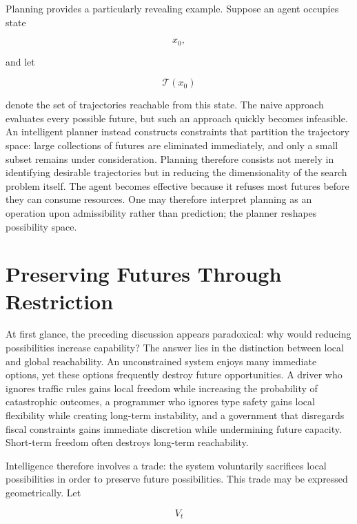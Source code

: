 \documentclass[11pt,oneside]{book}
\theoremstyle{plain}
\theoremstyle{definition}
\theoremstyle{remark}
\begin{document}
Planning provides a particularly revealing example. Suppose an agent occupies state

\begin{equation}
x_0,
\end{equation}

and let

\begin{equation}
\mathcal{T}(x_0)
\end{equation}

denote the set of trajectories reachable from this state. The naive approach evaluates every possible future, but such an approach quickly becomes infeasible. An intelligent planner instead constructs constraints that partition the trajectory space: large collections of futures are eliminated immediately, and only a small subset remains under consideration. Planning therefore consists not merely in identifying desirable trajectories but in reducing the dimensionality of the search problem itself. The agent becomes effective because it refuses most futures before they can consume resources. One may therefore interpret planning as an operation upon admissibility rather than prediction; the planner reshapes possibility space.

\section{Preserving Futures Through Restriction}

At first glance, the preceding discussion appears paradoxical: why would reducing possibilities increase capability? The answer lies in the distinction between local and global reachability. An unconstrained system enjoys many immediate options, yet these options frequently destroy future opportunities. A driver who ignores traffic rules gains local freedom while increasing the probability of catastrophic outcomes, a programmer who ignores type safety gains local flexibility while creating long-term instability, and a government that disregards fiscal constraints gains immediate discretion while undermining future capacity. Short-term freedom often destroys long-term reachability.

Intelligence therefore involves a trade: the system voluntarily sacrifices local possibilities in order to preserve future possibilities. This trade may be expressed geometrically. Let

\begin{equation}
V_t
\end{equation}
\end{document}
